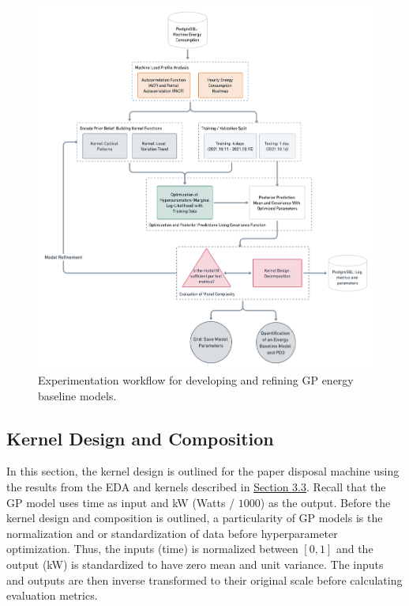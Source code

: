 \begin{figure}[H]
\centering
\graphicspath{ {./images/} }
\includegraphics[scale=0.32]{images/experiment_flow.png}
\caption{Experimentation workflow for developing and refining GP energy baseline models.}
\label{fig:fig12}
\end{figure}

\subsection{Kernel Design and Composition}

In this section, the kernel design is outlined for the paper disposal machine using the results from the EDA and kernels described in \hyperlink{subsection.3.3}{Section 3.3}. Recall that the GP model uses time as input and kW (Watts / $1000$) as the output. Before the kernel design and composition is outlined, a particularity of GP models is the normalization and or standardization of data before hyperparameter optimization. Thus, the inputs (time) is normalized between $[0, 1]$ and the output (kW) is standardized to have zero mean and unit variance. The inputs and outputs are then inverse transformed to their original scale before calculating evaluation metrics.

